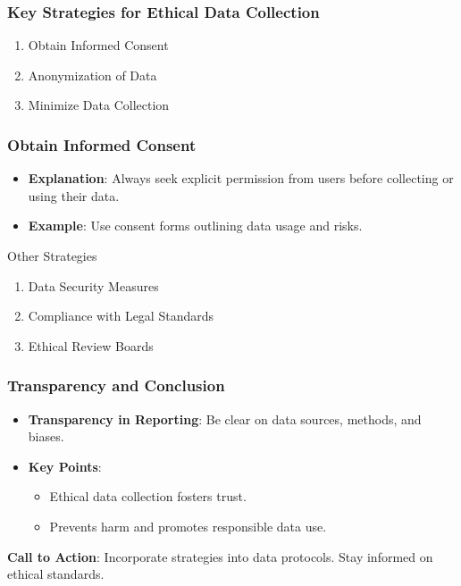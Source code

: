 \documentclass{beamer}
\begin{document}
\begin{frame}[fragile]
    \frametitle{Key Strategies for Ethical Data Collection}

    \begin{enumerate}
        \item Obtain Informed Consent
        \item Anonymization of Data
        \item Minimize Data Collection
    \end{enumerate}
\end{frame}

\begin{frame}[fragile]
    \frametitle{Obtain Informed Consent}

    \begin{itemize}
        \item \textbf{Explanation}: Always seek explicit permission from users before collecting or using their data.
        \item \textbf{Example}: Use consent forms outlining data usage and risks.
    \end{itemize}

    \vspace{10pt}

    \begin{block}{Other Strategies}
        \begin{enumerate}
            \item Data Security Measures
            \item Compliance with Legal Standards
            \item Ethical Review Boards
        \end{enumerate}
    \end{block}

\end{frame}

\begin{frame}[fragile]
    \frametitle{Transparency and Conclusion}

    \begin{itemize}
        \item \textbf{Transparency in Reporting}: Be clear on data sources, methods, and biases.
        \item \textbf{Key Points}:
        \begin{itemize}
            \item Ethical data collection fosters trust.
            \item Prevents harm and promotes responsible data use.
        \end{itemize}
    \end{itemize}

    \vspace{10pt}

    \textbf{Call to Action}: Incorporate strategies into data protocols. Stay informed on ethical standards.
\end{frame}
\end{document}
